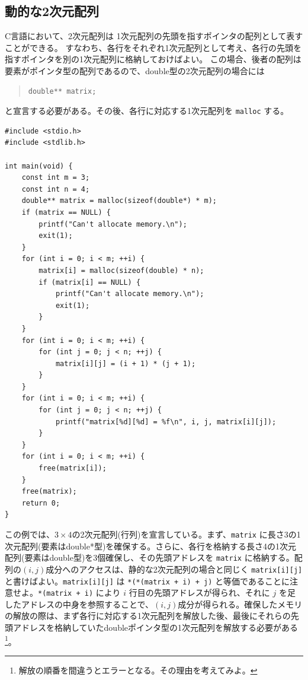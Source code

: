 \subsection{動的な2次元配列}

C言語において、2次元配列は 1次元配列の先頭を指すポインタの配列として表すことができる。
すなわち、各行をそれぞれ1次元配列として考え、各行の先頭を指すポインタを別の1次元配列に格納しておけばよい。
この場合、後者の配列は要素がポインタ型の配列であるので、double型の2次元配列の場合には
\begin{quote}
    \begin{verbatim}
double** matrix;
\end{verbatim}
\end{quote}
と宣言する必要がある。その後、各行に対応する1次元配列を \texttt{malloc} する。
\begin{reidai}\label{ex:malloc-2dim}
    \begin{verbatim}
#include <stdio.h>
#include <stdlib.h>

int main(void) {
    const int m = 3;
    const int n = 4;
    double** matrix = malloc(sizeof(double*) * m);
    if (matrix == NULL) {
        printf("Can't allocate memory.\n");
        exit(1);
    }
    for (int i = 0; i < m; ++i) {
        matrix[i] = malloc(sizeof(double) * n);
        if (matrix[i] == NULL) {
            printf("Can't allocate memory.\n");
            exit(1);
        }
    }
    for (int i = 0; i < m; ++i) {
        for (int j = 0; j < n; ++j) {
            matrix[i][j] = (i + 1) * (j + 1);
        }
    }
    for (int i = 0; i < m; ++i) {
        for (int j = 0; j < n; ++j) {
            printf("matrix[%d][%d] = %f\n", i, j, matrix[i][j]);
        }
    }
    for (int i = 0; i < m; ++i) {
        free(matrix[i]);
    }
    free(matrix);
    return 0;
}
\end{verbatim}
\end{reidai} \noindent
この例では、\(3 \times 4\)の2次元配列(行列)を宣言している。まず、\texttt{matrix} に長さ3の1次元配列(要素はdouble*型)を確保する。さらに、各行を格納する長さ4の1次元配列(要素はdouble型)を3個確保し、その先頭アドレスを \texttt{matrix} に格納する。配列の\((i,j)\)成分へのアクセスは、静的な2次元配列の場合と同じく \texttt{matrix[i][j]} と書けばよい。\texttt{matrix[i][j]} は \texttt{*(*(matrix + i) + j)} と等価であることに注意せよ。\texttt{*(matrix + i)} により \(i\) 行目の先頭アドレスが得られ、それに \(j\) を足したアドレスの中身を参照することで、\((i,j)\)成分が得られる。確保したメモリの解放の際は、まず各行に対応する1次元配列を解放した後、最後にそれらの先頭アドレスを格納していたdoubleポインタ型の1次元配列を解放する必要がある\footnote{解放の順番を間違うとエラーとなる。その理由を考えてみよ。}。

